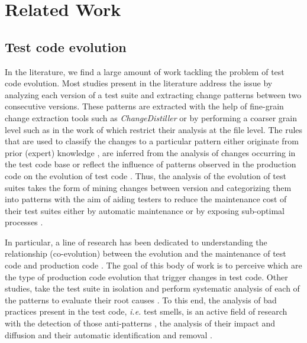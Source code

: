 \chapter{Related Work}
\label{chap:related-work}


\section{Test code evolution}
\label{sec:related-evolution}

In the literature, we find a large amount of work tackling the problem of test code evolution. Most studies present in the literature address the issue by analyzing each version of a test suite and extracting change patterns between two consecutive versions. These patterns are extracted with the help of fine-grain change extraction tools such as \emph{ChangeDistiller} \cite{Fluri2007} or by performing  a coarser grain level such as in the work of \textcite{Zaidman2011} which restrict their analysis at the file level. The rules that are used to classify the changes to a particular pattern either originate from prior (expert) knowledge \cite{Marsavina2014}, are inferred from the analysis of changes occurring in the test code base \cite{Negara2014, Labuschagne2017} or reflect the influence of patterns observed in the production code on the evolution of test code \cite{VanRompaey2008}. Thus, the analysis of the evolution of test suites takes the form of mining changes between version and categorizing them into patterns with the aim of aiding testers to reduce the maintenance cost of their test suites either by automatic maintenance \cite{Hurdugaci2012} or by exposing sub-optimal processes \cite{Labuschagne2017}.

In particular, a line of research has been dedicated to understanding the relationship (co-evolution) between the evolution and the maintenance of test code and production code \cite{Lamkanfi2010, Zaidman2011, Marsavina2014, Levin2017, Vidacs2018, Alenezi2019}. The goal of this body of work is to perceive which are the type of production code evolution that trigger changes in test code. Other studies, take the test suite in isolation and perform systematic analysis of each of the patterns to evaluate their root causes \cite{Pinto2012}. To this end, the analysis of bad practices present in the test code, \emph{i.e.} test smells, is an active field of research with the detection of those anti-patterns \cite{VanDeursen2001, Bowes2017, Tufano2016}, the analysis of their impact and diffusion \cite{Bavota2015, Tufano2016, Kim2020} and their automatic identification and removal \cite{VanRompaey2007, Reichhart2007, Peruma2020}.

